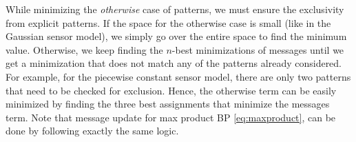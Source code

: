 \documentclass[letterpaper, 10 pt, conference]{ieeeconf} %
\begin{document}
While minimizing the \emph{otherwise} case of patterns, we must ensure the
exclusivity from explicit patterns.
If the space for the otherwise case
is small (like in the Gaussian sensor model), we simply go over the entire
space to find the minimum value. Otherwise,
we keep finding the $n$-best minimizations of messages until we get a minimization
that does not match any of the patterns already considered.  For example, 
for the piecewise constant sensor model, there are only two patterns that need
to be checked for exclusion. Hence, the otherwise term can be easily minimized by
finding the three best assignments that minimize the messages term. Note that
message update for max product BP \eqref{eq:maxproduct}, can be done by
following exactly the same logic.
\end{document}
